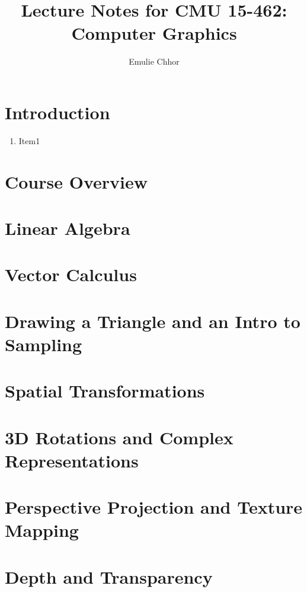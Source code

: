 \documentclass{article}
\begin{document}
\title{Lecture Notes for CMU 15-462: Computer Graphics}
\author{Emulie Chhor}
\maketitle

\section{Introduction}

    \begin{enumerate}
	\item Item1
    \end{enumerate}

\newtheorem{definition}{Definition}[subsection]
\newtheorem{theorem}{Theorem}[subsection]
\newtheorem{corollary}{Corollary}[subsection]
\newtheorem{lemma}[theorem]{Lemma}
\newtheorem{proposition}{Proposition}[section]
\newtheorem{axiom}{Axiome}
\newtheorem{property}{Propriété}[subsection]
\newtheorem*{remark}{Remarque}
\newtheorem*{problem}{Problème}
\newtheorem*{intuition}{Intuition}

\section{Course Overview}
\section{Linear Algebra}
\section{Vector Calculus}
\section{Drawing a Triangle and an Intro to Sampling}
\section{Spatial Transformations}
\section{3D Rotations and Complex Representations}
\section{Perspective Projection and Texture Mapping}
\section{Depth and Transparency}
\end{document}
